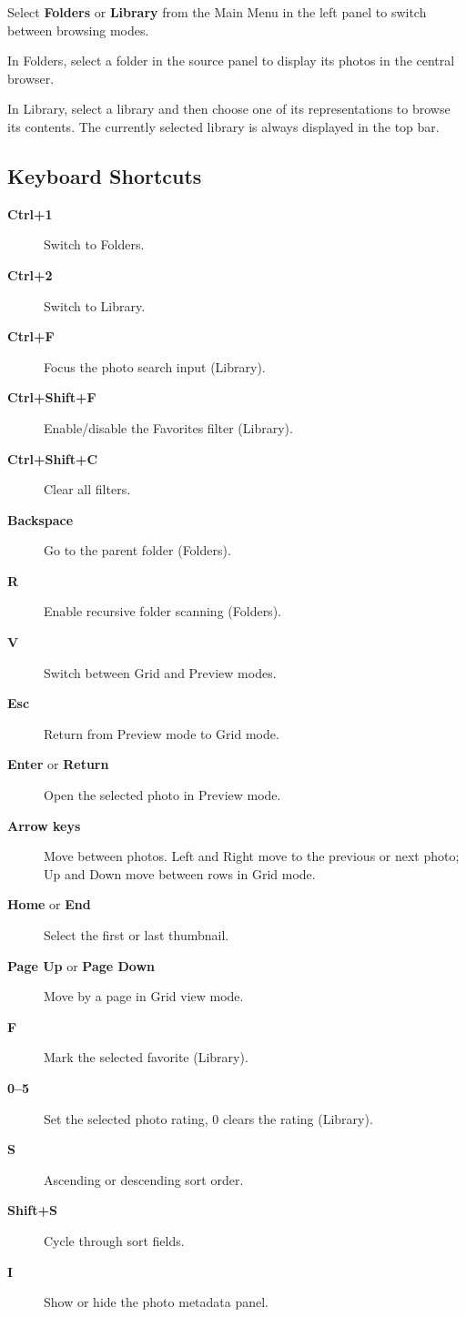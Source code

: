\documentclass[11pt]{article}
\begin{document}
Select \textbf{Folders} or \textbf{Library} from the Main Menu in the left
panel to switch between browsing modes.

In Folders, select a folder in the source panel to display its photos in the central browser.

In Library, select a library and then choose one of its representations to browse its contents.
The currently selected library is always displayed in the top bar.

\subsection{Keyboard Shortcuts}

\begin{description}
  \item[\textbf{Ctrl+1}] Switch to Folders.
  \item[\textbf{Ctrl+2}] Switch to Library.
  \item[\textbf{Ctrl+F}] Focus the photo search input (Library).
  \item[\textbf{Ctrl+Shift+F}] Enable/disable the Favorites filter (Library).
  \item[\textbf{Ctrl+Shift+C}] Clear all filters.
  \item[\textbf{Backspace}] Go to the parent folder (Folders).
  \item[\textbf{R}] Enable recursive folder scanning (Folders).
  \item[\textbf{V}] Switch between Grid and Preview modes.
  \item[\textbf{Esc}] Return from Preview mode to Grid mode.
  \item[\textbf{Enter} or \textbf{Return}] Open the selected photo in Preview mode.
  \item[\textbf{Arrow keys}] Move between photos. Left and Right move to the
        previous or next photo; Up and Down move between rows in Grid mode.
  \item[\textbf{Home} or \textbf{End}] Select the first or last thumbnail.
  \item[\textbf{Page Up} or \textbf{Page Down}] Move by a page in Grid view mode.
  \item[\textbf{F}] Mark the selected favorite (Library).
  \item[\textbf{0--5}] Set the selected photo rating, 0 clears the rating (Library).
  \item[\textbf{S}] Ascending or descending sort order.
  \item[\textbf{Shift+S}] Cycle through sort fields.
  \item[\textbf{I}] Show or hide the photo metadata panel.
\end{description}
\end{document}
